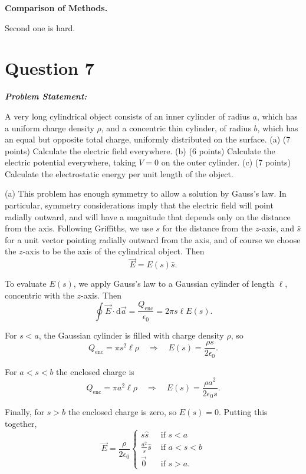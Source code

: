 \documentclass[12pt]{article}
\newenvironment{q}
{
    \begin{qframe}
    \noindent\textit{\textbf{Problem Statement:}}
    \par\smallskip
}
{
    \end{qframe}
}
\begin{document}
\textbf{Comparison of Methods.}

Second one is hard.


\newpage
\section*{Question 7}
\begin{q}
A very long cylindrical object consists of an inner cylinder of radius \(a\), which has a uniform charge density \(\rho\), and a concentric thin cylinder, of radius \(b\), which has an equal but opposite total charge, uniformly distributed on the surface.
(a) (7 points) Calculate the electric field everywhere.
(b) (6 points) Calculate the electric potential everywhere, taking \(V=0\) on the outer cylinder.
(c) (7 points) Calculate the electrostatic energy per unit length of the object.
\end{q}


(a) This problem has enough symmetry to allow a solution by Gauss's law. In particular, symmetry considerations imply that the electric field will point radially outward, and will have a magnitude that depends only on the distance from the axis. Following Griffiths, we use \(s\) for the distance from the \(z\)-axis, and \(\hat{s}\) for a unit vector pointing radially outward from the axis, and of course we choose the \(z\)-axis to be the axis of the cylindrical object. Then
\[
\vec{E}=E(s) \hat{s} .
\]

To evaluate \(E(s)\), we apply Gauss's law to a Gaussian cylinder of length \(\ell\), concentric with the \(z\)-axis. Then
\[
\oint \vec{E} \cdot \mathrm{d} \vec{a}=\frac{Q_{\mathrm{enc}}}{\epsilon_0}=2 \pi s \ell E(s) .
\]

For \(s<a\), the Gaussian cylinder is filled with charge density \(\rho\), so
\[
Q_{\mathrm{enc}}=\pi s^2 \ell \rho \quad \Longrightarrow \quad E(s)=\frac{\rho s}{2 \epsilon_0} .
\]

For \(a<s<b\) the enclosed charge is
\[
Q_{\mathrm{enc}}=\pi a^2 \ell \rho \quad \Longrightarrow \quad E(s)=\frac{\rho a^2}{2 \epsilon_0 s} .
\]

Finally, for \(s>b\) the enclosed charge is zero, so \(E(s)=0\). Putting this together,
\[
\vec{E}=\frac{\rho}{2 \epsilon_0} \begin{cases}s \hat{s} & \text { if } s<a \\ \frac{a^2}{s} \hat{s} & \text { if } a<s<b \\ \overrightarrow{0} & \text { if } s>a .\end{cases}
\]
\end{document}
